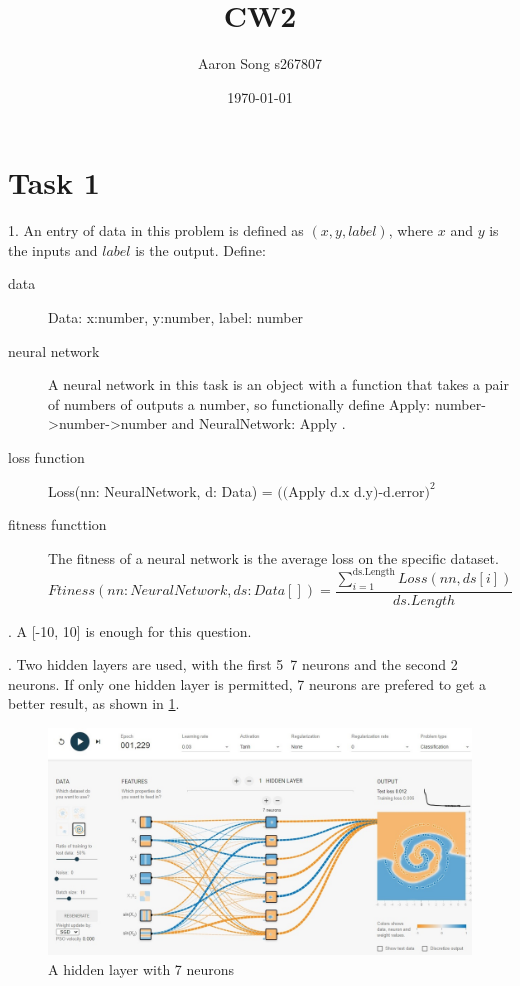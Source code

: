\documentclass[12pt]{article}
\author{Aaron Song s267807}
\title{CW2}
\date{\today}
\begin{document}
\maketitle



\section{Task 1}

1. An entry of data in this problem is defined as $(x,y,label)$, where $x$ and $y$ is the inputs and $label$ is the output. Define:
\begin{description}
    \item[data] Data: x:number, y:number, label: number
    \item[neural network] A neural network in this task is an object with a function that takes a pair of numbers of outputs a number, so functionally define Apply: number->number->number and NeuralNetwork: { Apply }.
    \item[loss function] Loss(nn: NeuralNetwork, d: Data) = $((\textrm{Apply d.x d.y)-d.error)}^2$
    \item[fitness functtion] The fitness of a neural network is the average loss on the specific dataset. $$Ftiness(nn: NeuralNetwork, ds: Data[]) = \frac{\sum_{i=1}^{\textrm{ds.Length}}Loss(nn, ds[i])}{ds.Length}$$
\end{description}

. A [-10, 10] is enough for this question.

. Two hidden layers are used, with the first 5~7 neurons and the second 2 neurons. If only one hidden layer is permitted, 7 neurons are prefered to get a better result, as shown in \ref{7n}.
\begin{figure}[!ht]
    \centering
    \includegraphics[width=\textwidth]{1.jpg}
    \caption{A hidden layer with 7 neurons}
    \label{7n}
\end{figure}
\end{document}
